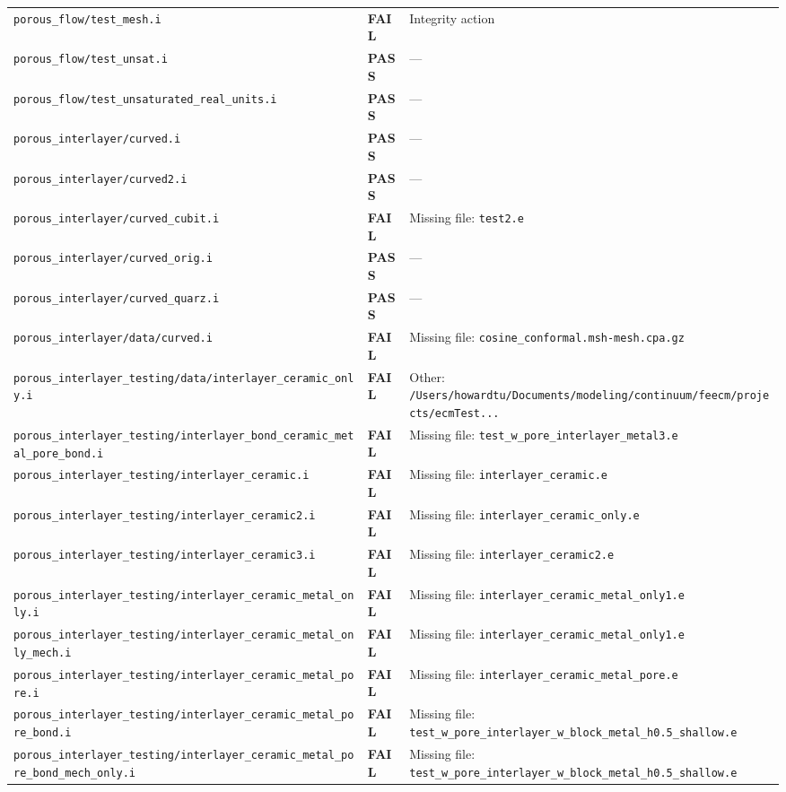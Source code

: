 \documentclass[10pt,letterpaper]{article}
\newcommand{\PASS}{\textcolor{passgreen}{\textbf{PASS}}}
\newcommand{\FAIL}{\textcolor{failred}{\textbf{FAIL}}}
\newcommand{\code}[1]{\texttt{\small #1}}
\begin{document}
\begin{longtable}{p{} l p{}}
\code{porous\_flow/test\_mesh.i} & \FAIL & Integrity action \\
\code{porous\_flow/test\_unsat.i} & \PASS & --- \\
\code{porous\_flow/test\_unsaturated\_real\_units.i} & \PASS & --- \\
\code{porous\_interlayer/curved.i} & \PASS & --- \\
\code{porous\_interlayer/curved2.i} & \PASS & --- \\
\code{porous\_interlayer/curved\_cubit.i} & \FAIL & Missing file: \code{test2.e} \\
\code{porous\_interlayer/curved\_orig.i} & \PASS & --- \\
\code{porous\_interlayer/curved\_quarz.i} & \PASS & --- \\
\code{porous\_interlayer/data/curved.i} & \FAIL & Missing file: \code{cosine\_conformal.msh-mesh.cpa.gz} \\
\code{porous\_interlayer\_testing/data/interlayer\_ceramic\_only.i} & \FAIL & Other: \code{/Users/howardtu/Documents/modeling/continuum/feecm/projects/ecmTest...} \\
\code{porous\_interlayer\_testing/interlayer\_bond\_ceramic\_metal\_pore\_bond.i} & \FAIL & Missing file: \code{test\_w\_pore\_interlayer\_metal3.e} \\
\code{porous\_interlayer\_testing/interlayer\_ceramic.i} & \FAIL & Missing file: \code{interlayer\_ceramic.e} \\
\code{porous\_interlayer\_testing/interlayer\_ceramic2.i} & \FAIL & Missing file: \code{interlayer\_ceramic\_only.e} \\
\code{porous\_interlayer\_testing/interlayer\_ceramic3.i} & \FAIL & Missing file: \code{interlayer\_ceramic2.e} \\
\code{porous\_interlayer\_testing/interlayer\_ceramic\_metal\_only.i} & \FAIL & Missing file: \code{interlayer\_ceramic\_metal\_only1.e} \\
\code{porous\_interlayer\_testing/interlayer\_ceramic\_metal\_only\_mech.i} & \FAIL & Missing file: \code{interlayer\_ceramic\_metal\_only1.e} \\
\code{porous\_interlayer\_testing/interlayer\_ceramic\_metal\_pore.i} & \FAIL & Missing file: \code{interlayer\_ceramic\_metal\_pore.e} \\
\code{porous\_interlayer\_testing/interlayer\_ceramic\_metal\_pore\_bond.i} & \FAIL & Missing file: \code{test\_w\_pore\_interlayer\_w\_block\_metal\_h0.5\_shallow.e} \\
\code{porous\_interlayer\_testing/interlayer\_ceramic\_metal\_pore\_bond\_mech\_only.i} & \FAIL & Missing file: \code{test\_w\_pore\_interlayer\_w\_block\_metal\_h0.5\_shallow.e} \\

\end{longtable}
\end{document}
